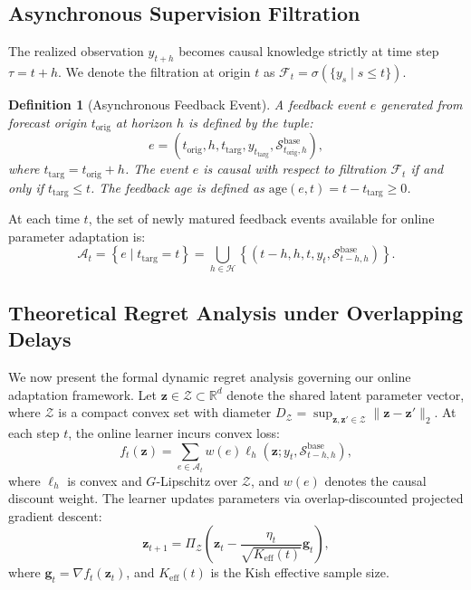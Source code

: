 \documentclass[10pt,journal,compsoc]{IEEEtran}
\newtheorem{definition}{Definition}
\begin{document}
\subsection{Asynchronous Supervision Filtration}
The realized observation $y_{t+h}$ becomes causal knowledge strictly at time step $\tau = t + h$. We denote the filtration at origin $t$ as $\mathcal{F}_t = \sigma(\{y_s \mid s \le t\})$. 

\begin{definition}[Asynchronous Feedback Event]
A feedback event $e$ generated from forecast origin $t_{\text{orig}}$ at horizon $h$ is defined by the tuple:
\begin{equation}
e = \left( t_{\text{orig}}, h, t_{\text{targ}}, y_{t_{\text{targ}}}, \mathcal{S}_{t_{\text{orig}},h}^{\text{base}} \right),
\end{equation}
where $t_{\text{targ}} = t_{\text{orig}} + h$. The event $e$ is causal with respect to filtration $\mathcal{F}_t$ if and only if $t_{\text{targ}} \le t$. The feedback age is defined as $\text{age}(e, t) = t - t_{\text{targ}} \ge 0$.
\end{definition}

At each time $t$, the set of newly matured feedback events available for online parameter adaptation is:
\begin{equation}
\mathcal{A}_t = \left\{ e \mid t_{\text{targ}} = t \right\} = \bigcup_{h \in \mathcal{H}} \left\{ (t-h, h, t, y_t, \mathcal{S}_{t-h, h}^{\text{base}}) \right\}.
\end{equation}

\subsection{Theoretical Regret Analysis under Overlapping Delays}
We now present the formal dynamic regret analysis governing our online adaptation framework. Let $\mathbf{z} \in \mathcal{Z} \subset \mathbb{R}^d$ denote the shared latent parameter vector, where $\mathcal{Z}$ is a compact convex set with diameter $D_{\mathcal{Z}} = \sup_{\mathbf{z}, \mathbf{z}' \in \mathcal{Z}} \|\mathbf{z} - \mathbf{z}'\|_2$. At each step $t$, the online learner incurs convex loss:
\begin{equation}
f_t(\mathbf{z}) = \sum_{e \in \mathcal{A}_t} w(e) \ell_h\left(\mathbf{z}; y_t, \mathcal{S}_{t-h,h}^{\text{base}}\right),
\end{equation}
where $\ell_h$ is convex and $G$-Lipschitz over $\mathcal{Z}$, and $w(e)$ denotes the causal discount weight. The learner updates parameters via overlap-discounted projected gradient descent:
\begin{equation}
\mathbf{z}_{t+1} = \Pi_{\mathcal{Z}} \left( \mathbf{z}_t - \frac{\eta_t}{\sqrt{K_{\text{eff}}(t)}} \mathbf{g}_t \right),
\end{equation}
where $\mathbf{g}_t = \nabla f_t(\mathbf{z}_t)$, and $K_{\text{eff}}(t)$ is the Kish effective sample size.
\end{document}
